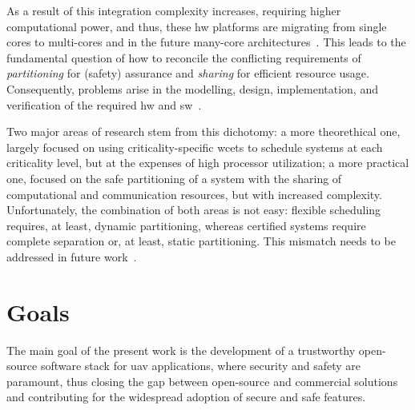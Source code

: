 As a result of this integration
complexity increases, requiring higher computational power, and thus, these
\gls{hw} platforms are migrating from single cores to multi-cores and in the
future many-core architectures~\cite{burns2022mixed}. This leads to the
fundamental question of how to reconcile the
conflicting requirements of \emph{partitioning} for (safety) assurance and \emph{sharing} for
efficient resource usage. Consequently, problems arise in the modelling, design,
implementation, and verification of the required \gls{hw} and
\gls{sw}~\cite{burns2022mixed}.

Two major areas of research stem from this dichotomy: a more theorethical one,
largely focused on using criticality-specific \glspl{wcet} to schedule systems
at each criticality level, but at the expenses of high processor utilization; a
more practical one, focused on the safe partitioning of a system with the
sharing of computational and communication resources, but with increased
complexity.
Unfortunately, the combination of both areas is not easy: flexible scheduling
requires, at least, dynamic partitioning, whereas certified systems require
complete separation or, at least, static partitioning. This mismatch needs to be
addressed in future work~\cite{burns2022mixed}.

%

\section{Goals}
The main goal of the present work is the development of a trustworthy
open-source software stack for \gls{uav} applications, where security and safety
are paramount, thus closing the gap between open-source and commercial solutions
and contributing for the widespread adoption of secure and safe features.

